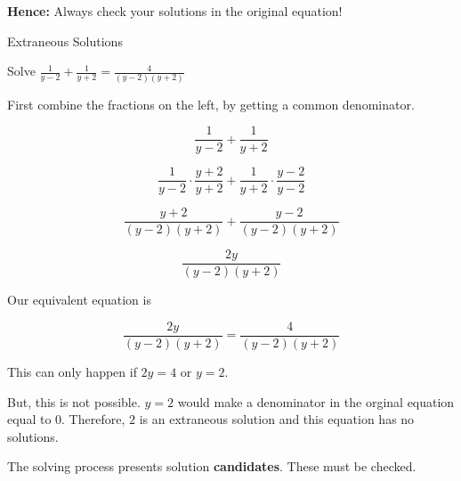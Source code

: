 \documentclass{ximera}
\begin{document}
\textbf{Hence:} Always check your solutions in the original equation!







\begin{example} Extraneous Solutions


Solve $\frac{1}{y-2} + \frac{1}{y+2} = \frac{4}{(y-2)(y+2)}$


\begin{explanation}



First combine the fractions on the left, by getting a common denominator.



\[    \frac{1}{y-2} + \frac{1}{y+2}        \]

\[    \frac{1}{y-2} \cdot \frac{y+2}{y+2} + \frac{1}{y+2}  \cdot \frac{y-2}{y-2}       \]

\[    \frac{y+2}{(y-2)(y+2)} + \frac{y-2}{(y-2)(y+2)}      \]

\[    \frac{2y}{(y-2)(y+2)}     \]

Our equivalent equation is


\[    \frac{2y}{(y-2)(y+2)}   = \frac{4}{(y-2)(y+2)}   \]


This can only happen if $2y = 4$ or $y = 2$.

But, this is not possible.  $y=2$ would make a denominator in the orginal equation equal to $0$.  Therefore, $2$ is an extraneous solution and this equation has no solutions.


\end{explanation}
\end{example}



The solving process presents solution \textbf{candidates}.  These must be checked.
\end{document}
